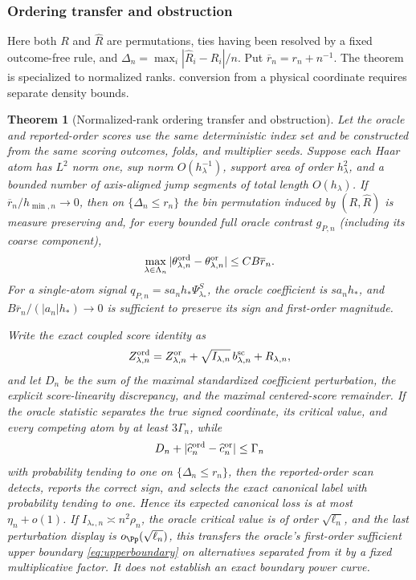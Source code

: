 \documentclass[11pt]{article}
\newtheorem{theorem}{Theorem}[section]
\theoremstyle{definition}
\newcommand{\1}{\mathbf 1}\newcommand{\op}{\operatorname}
\begin{document}
\subsubsection{Ordering transfer and obstruction}

Here both $R$ and $\widehat R$ are permutations, ties having been resolved by a fixed
outcome-free rule, and
$\Delta_n=\max_i|\widehat R_i-R_i|/n$.  Put
$\overline r_n=r_n+n^{-1}$.  The theorem is specialized to normalized ranks.
conversion from a physical coordinate requires separate density bounds.

\begin{theorem}[Normalized-rank ordering transfer and obstruction]         \label{thm:order}
Let the oracle and reported-order scores use the same deterministic index set and be
constructed from the same scoring outcomes, folds, and multiplier seeds.  Suppose
each Haar atom has $L^2$ norm one, sup norm $O(h_\lambda^{-1})$,
support area of order $h_\lambda^2$, and a bounded number of axis-aligned jump
segments of total length $O(h_\lambda)$.  If
$\overline r_n/h_{\min,n}\to0$, then on $\{\Delta_n\le r_n\}$ the bin permutation
induced by $(R,\widehat R)$ is measure preserving and, for every bounded full oracle
contrast $g_{P,n}$ (including its coarse component),
\begin{equation}
 \max_{\lambda\in\Lambda_n}
 |\theta_{\lambda,n}^{\rm ord}-\theta_{\lambda,n}^{\rm or}|
 \le CB\overline r_n.                                           \label{eq:ordercoef}
\end{equation}
For a single-atom signal $q_{P,n}=sa_nh_*\Psi_{\lambda_*}^S$, the oracle coefficient
is $sa_nh_*$, and $B\overline r_n/(|a_n|h_*)\to0$ is sufficient to preserve its
sign and first-order magnitude.

Write the exact coupled score identity as
\[
 Z_{\lambda,n}^{\rm ord}=Z_{\lambda,n}^{\rm or}
 +\sqrt{I_{\lambda,n}}\,b_{\lambda,n}^{\rm sc}+R_{\lambda,n},
\]
and let $D_n$ be the sum of the maximal standardized coefficient perturbation, the
explicit score-linearity discrepancy, and the maximal centered-score remainder.
If the oracle statistic separates the true signed coordinate, its critical value,
and every competing atom by at least $3\Gamma_n$, while
\[
 D_n+|\widehat c_n^{\rm ord}-\widehat c_n^{\rm or}|\le\Gamma_n
\]
with probability tending to one on $\{\Delta_n\le r_n\}$, then the reported-order
scan detects, reports the correct sign, and selects the exact canonical label with
probability tending to one.  Hence its expected canonical loss is at most
$\eta_n+o(1)$.  If $I_{\lambda_*,n}\asymp n^2\rho_n$, the oracle critical value is
of order $\sqrt{\ell_n}$, and the last perturbation display is
$o_\Pp(\sqrt{\ell_n})$, this transfers the oracle's first-order \emph{sufficient}
upper boundary \eqref{eq:upperboundary} on alternatives separated from it by a fixed
multiplicative factor.  It does not establish an exact boundary power curve.


\end{theorem}
\end{document}
